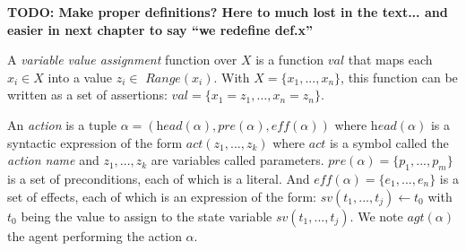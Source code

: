 
\textbf{TODO: Make proper definitions? Here to much lost in the text... and easier in next chapter to say ``we redefine def.x''}

A \textit{variable value assignment} function over $X$ is a function $val$ that maps each $x_i \in X$ into a value $z_i \in$ $\textit{Range}(x_i)$. With $X = \{ x_1, ..., x_n \}$, this function can be written as a set of assertions: $val = \{ x_1=z_1, \ldots, x_n=z_n \}$. 

An \textit{action} is a tuple $\alpha = (\textit{head}(\alpha), \textit{pre}(\alpha), \textit{eff}(\alpha))$ where $\textit{head}(\alpha)$ is a syntactic expression of the form $\textit{act}(z_1, ..., z_k)$ where $act$ is a symbol called the \textit{action name} and $z_1,...,z_k$ are variables called parameters. $\textit{pre}(\alpha) = \{ p_1, ..., p_m \}$ is a set of preconditions, each of which is a literal. And $\textit{eff}(\alpha) = \{ e_1, ..., e_n \}$ is a set of effects, each of which is an expression of the form: $sv(t_1, ..., t_j) \leftarrow t_0$ with $t_0$ being the value to assign to the state variable $sv(t_1, ..., t_j)$. We note $\textit{agt}(\alpha)$ the agent performing the action $\alpha$.

